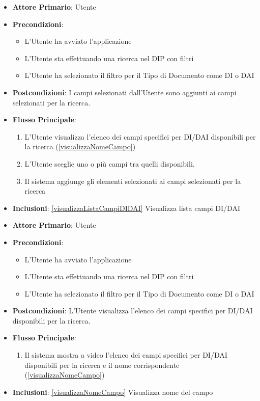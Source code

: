 \begin{itemize}
      \item \textbf{Attore Primario}: Utente
      \item \textbf{Precondizioni}: \begin{itemize}
            \item L'Utente ha avviato l'applicazione
            \item L'Utente sta effettuando una ricerca nel DIP con filtri
            \item L'Utente ha selezionato il filtro per il Tipo di Documento come DI o DAI
      \end{itemize}
      \item \textbf{Postcondizioni}:  I campi selezionati dall'Utente sono aggiunti ai campi selezionati per la ricerca.
      \item \textbf{Flusso Principale}:
            \begin{enumerate}
                  \item L'Utente visualizza l'elenco dei campi specifici per DI/DAI disponibili per la ricerca (\ref{visualizzaNomeCampo})
                  \item L'Utente sceglie uno o più campi tra quelli disponibili.
                  \item Il sistema aggiunge gli elementi selezionati ai campi selezionati per la ricerca
            \end{enumerate}
      \item \textbf{Inclusioni}: \ref{visualizzaListaCampiDIDAI} Visualizza lista campi DI/DAI
\end{itemize}

\begin{itemize}
      \item \textbf{Attore Primario}: Utente
      \item \textbf{Precondizioni}: \begin{itemize}
            \item L'Utente ha avviato l'applicazione
            \item L'Utente sta effettuando una ricerca nel DIP con filtri
            \item L'Utente ha selezionato il filtro per il Tipo di Documento come DI o DAI
      \end{itemize}
      \item \textbf{Postcondizioni}:  L'Utente visualizza l'elenco dei campi specifici per DI/DAI disponibili per la ricerca.
      \item \textbf{Flusso Principale}:
            \begin{enumerate}
                  \item Il sistema mostra a video l'elenco dei campi specifici per DI/DAI disponibili per la ricerca e il nome corrispondente (\ref{visualizzaNomeCampo})
            \end{enumerate}
      \item \textbf{Inclusioni}: \ref{visualizzaNomeCampo} Visualizza nome del campo
\end{itemize}

